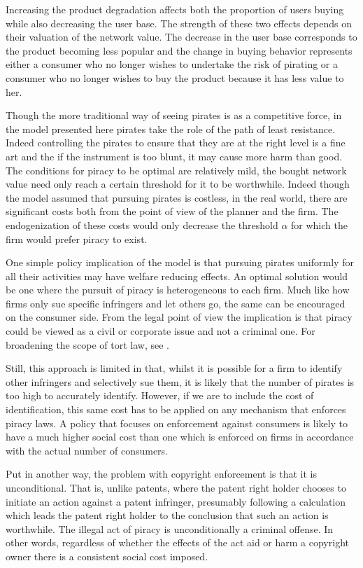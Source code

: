 \documentclass[12pt]{report}
\numberwithin{equation}{section}
\begin{document}
Increasing the product degradation affects both the proportion of users buying while also decreasing the user base. The strength of these two effects depends on their valuation of the network value. The decrease in the user base corresponds to the product becoming less popular and the change in buying behavior represents either a consumer who no longer wishes to undertake the risk of pirating or a consumer who no longer wishes to buy the product because it has less value to her.

Though the more traditional way of seeing pirates is as a competitive force, in the model presented here pirates take the role of the path of least resistance. Indeed controlling the pirates to ensure that they are at the right level is a fine art and the if the instrument is too blunt, it may cause more harm than good. The conditions for piracy to be optimal are relatively mild, the bought network value need only reach a certain threshold for it to be worthwhile. Indeed though the model assumed that pursuing pirates is costless, in the real world, there are significant costs both from the point of view of the planner and the firm. The endogenization of these costs would only decrease the threshold $\alpha$ for which the firm would prefer piracy to exist.

One simple policy implication of the model is that pursuing pirates uniformly for all their activities may have welfare reducing effects. An optimal solution would be one where the pursuit of piracy is  heterogeneous to each firm. Much like how firms only sue specific infringers and let others go, the same can be encouraged on the consumer side. From the legal point of view the implication is that piracy could be viewed as a civil or corporate issue and not a criminal one. For broadening the scope of tort law, see \citep{DF96}. 

Still, this approach is limited in that, whilst it is possible for a firm to identify other infringers and selectively sue them, it is likely that the number of pirates is too high to accurately identify. However, if we are to include the cost of identification, this same cost has to be applied on any mechanism that enforces piracy laws. A policy that focuses on enforcement against consumers is likely to have a much higher social cost than one which is enforced on firms in accordance with the actual number of consumers. 

Put in another way, the problem with copyright enforcement is that it is unconditional. That is, unlike patents, where the patent right holder chooses to initiate an action against a patent infringer, presumably following a calculation which leads the patent right holder to the conclusion that such an action is worthwhile. The illegal act of piracy is unconditionally a criminal offense. In other words, regardless of whether the effects of the act aid or harm a copyright owner there is a consistent social cost imposed. 
\end{document}
